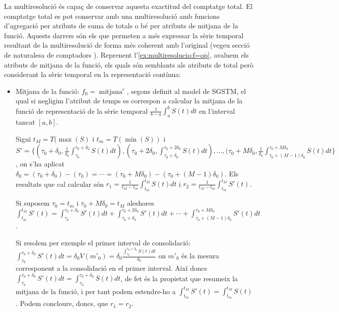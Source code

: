   La multiresolució és capaç de conservar aquesta exactitud del
  comptatge total.  El comptatge total es pot conservar amb una
  multiresolució amb funcions d'agregació per atributs de suma de
  totals o bé per atributs de mitjana de la funció. Aquests darrers
  són els que permeten a més expressar la sèrie temporal resultant de
  la multiresolució de forma més coherent amb l'original (vegeu secció
  de naturalesa de comptadors ). Reprenent
  l'\autoref{ex:multiresolucio:f=op}, avaluem els atributs de mitjana
  de la funció, els quals són semblants als atributs de total però
  considerant la sèrie temporal en la representació contínua:
  
  \begin{itemize}

  \item Mitjana de la funció:
    $f_0=\operatorname{mitjana}^c$, segons definit al model de \gls{SGSTM}, el qual si
    negligim l'atribut de temps es correspon a calcular la mitjana
    de la funció de representació de la sèrie temporal $\frac{1}{b-a}
    \int_{a}^{b} S(t)dt$ en l'interval tancat $[a,b]$.

    Sigui $t_M=T(\max(S)$ i $t_m=T(\min(S))$ i $S'= \{
    (\tau_0+\delta_0, \frac{1}{\delta_0}
    \int_{\tau_0}^{\tau_0+\delta_0} S(t) dt), (\tau_0+2\delta_0,
    \int_{\tau_0+\delta_0}^{\tau_0+2\delta_0} S(t) dt), \dotsc,
    (\tau_0+M\delta_0, \frac{1}{\delta_0}
    \int_{\tau_0+(M-1)\delta_0}^{\tau_0+M\delta_0} S(t) dt \}$, on
    s'ha aplicat $\delta_0= (\tau_0+\delta_0)-(\tau_0)=\dotsb=
    (\tau_0+M\delta_0)-(\tau_0+(M-1)\delta_0)$.  Els resultats que cal
    calcular són $r_1=\frac{1}{t_M-t_m} \int_{t_m}^{t_M} S(t)dt$ i
    $r_2 = \frac{1}{t_M-t_m} \int_{t_m}^{t_M} S'(t)$.

    Si suposem $\tau_0=t_m$ i $\tau_0+M\delta_0=t_M$ aleshores
    $\int_{t_m}^{t_M} S'(t) = \int_{\tau_0}^{\tau_0+\delta_0} S'(t) dt + \int_{\tau_0+\delta_0}^{\tau_0+2\delta_0} S'(t) dt + \dotsb + \int_{\tau_0+(M-1)\delta_0}^{\tau_0+M\delta_0}
    S'(t) dt$.  
    
    Si resolem per exemple el primer interval de consolidació: $
    \int_{\tau_0}^{\tau_0+\delta_0} S'(t) dt = \delta_0V(m'_0) =
    \delta_0 \frac{ \int_{\tau_0}^{\tau_0+\delta_0} S(t)
      dt}{\delta_0}$ on $m'_0$ és la mesura corresponent a la
    consolidació en el primer interval. Així doncs
    $\int_{\tau_0}^{\tau_0+\delta_0} S'(t) dt =
    \int_{\tau_0}^{\tau_0+\delta_0} S(t) dt$, de fet és la propietat
    que resumeix la mitjana de la funció, i per tant podem estendre-ho
    a $\int_{t_m}^{t_M} S'(t)= \int_{t_m}^{t_M} S(t)$. Podem
    concloure, doncs, que $r_1=r_2$.



\end{itemize}
